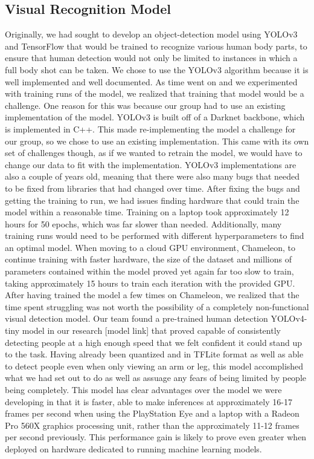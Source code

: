 \documentclass{article}
\begin{document}
\subsection{Visual Recognition Model}
Originally, we had sought to develop an object-detection model using YOLOv3 and TensorFlow that would be trained to recognize various human body parts, to ensure that human detection would not only be limited to instances in which a full body shot can be taken. We chose to use the YOLOv3 algorithm because it is well implemented and well documented. As time went on and we experimented with training runs of the model, we realized that training that model would be a challenge. One reason for this was because our group had to use an existing implementation of the model. YOLOv3 is built off of a Darknet backbone, which is implemented in C++. This made re-implementing the model a challenge for our group, so we chose to use an existing implementation. This came with its own set of challenges though, as if we wanted to retrain the model, we would have to change our data to fit with the implementation. YOLOv3 implementations are also a couple of years old, meaning that there were also many bugs that needed to be fixed from libraries that had changed over time. After fixing the bugs and getting the training to run, we had issues finding hardware that could train the model within a reasonable time. Training on a laptop took approximately 12 hours for 50 epochs, which was far slower than needed. Additionally, many training runs would need to be performed with different hyperparameters to find an optimal model. When moving to a cloud GPU environment, Chameleon, to continue training with faster hardware, the size of the dataset and millions of parameters contained within the model proved yet again far too slow to train, taking approximately 15 hours to train each iteration with the provided GPU. After having trained the model a few times on Chameleon, we realized that the time spent struggling was not worth the possibility of a completely non-functional visual detection model.
Our team found a pre-trained human detection YOLOv4-tiny model in our research [model link] that proved capable of consistently detecting people at a high enough speed that we felt confident it could stand up to the task. Having already been quantized and in TFLite format as well as able to detect people even when only viewing an arm or leg, this model accomplished what we had set out to do as well as assuage any fears of being limited by people being completely. This model has clear advantages over the model we were developing in that it is faster, able to make inferences at approximately 16-17 frames per second when using the PlayStation Eye and a laptop with a Radeon Pro 560X graphics processing unit, rather than the approximately 11-12 frames per second previously. This performance gain is likely to prove even greater when deployed on hardware dedicated to running machine learning models.
\end{document}
